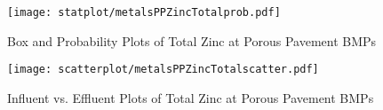         \begin{figure}[hb]   %
            \centering
            \texttt{[image: statplot/metalsPPZincTotalprob.pdf]}
            \caption{Box and Probability Plots of Total Zinc at Porous Pavement BMPs}
        \end{figure}         %
        
        
        \begin{figure}[hb]   %
            \centering
            \texttt{[image: scatterplot/metalsPPZincTotalscatter.pdf]}
            \caption{Influent vs. Effluent Plots of Total Zinc at Porous Pavement BMPs}
        \end{figure}         %
        \clearpage
        